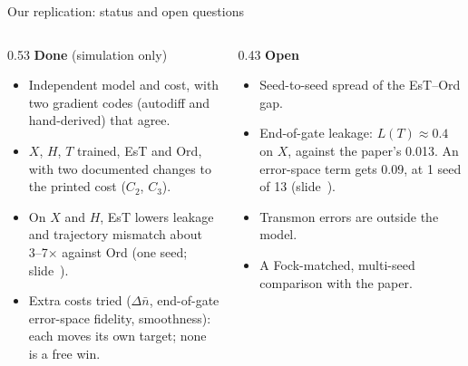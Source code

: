 \begin{frame}{Our replication: status and open questions}
  \begin{columns}[T, onlytextwidth]
    \begin{column}{0.53\textwidth}
      \textbf{Done} {\color{tagmid}\small(simulation only)}
      \begin{itemize}
        \item Independent model and cost, with two gradient codes (autodiff and hand-derived)
              that agree.
        \item $X$, $H$, $T$ trained, EsT and Ord, with two documented changes to the printed
              cost ($C_2$, $C_3$).
        \item On $X$ and $H$, EsT lowers leakage and trajectory mismatch about 3--7$\times$
              against Ord (one seed; slide~).
        \item Extra costs tried ($\Delta\bar n$, end-of-gate error-space fidelity,
              smoothness): each moves its own target; none is a free win.
      \end{itemize}
    \end{column}
    \begin{column}{0.43\textwidth}
      \textbf{Open}
      \begin{itemize}
        \item Seed-to-seed spread of the EsT--Ord gap.
        \item End-of-gate leakage: $L(T) \approx 0.4$ on $X$, against the paper's 0.013. An
              error-space term gets 0.09, at 1 seed of 13 (slide~).
        \item Transmon errors are outside the model.
        \item A Fock-matched, multi-seed comparison with the paper.
      \end{itemize}
    \end{column}
  \end{columns}
\end{frame}
